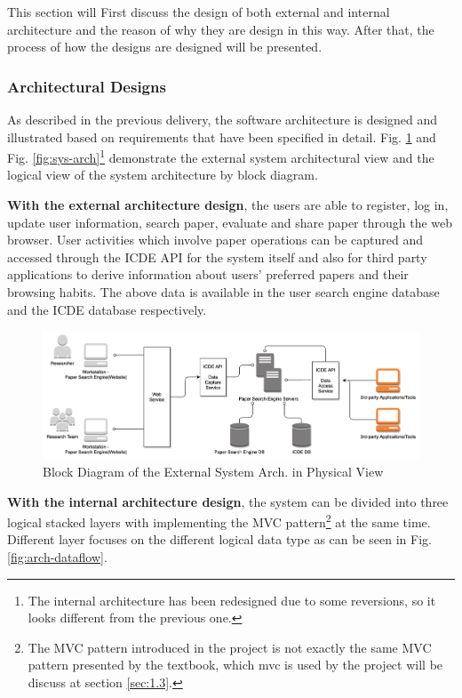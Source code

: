 \documentclass[conference]{IEEEtran}
\begin{document}
This section will First discuss the design of both external and internal architecture and the reason of why they are design in this way.
After that, the process of how the designs are designed will be presented.

\subsubsection{\textbf{Architectural Designs}}
\label{sec:1.1.1}

As described in the previous delivery, the software architecture is designed and illustrated based on requirements that have been specified in detail.
Fig. \ref{fig:sys-context} and  Fig. \ref{fig:sys-arch}\footnote{The internal architecture has been redesigned due to some reversions, so it looks different from the previous one.}
demonstrate the external system architectural view and the logical view of the system architecture by block diagram.

\textbf{With the external architecture design}, the users are able to register, log in, update user information, search paper, evaluate and share paper through the web browser.
User activities which involve paper operations can be captured and accessed through the ICDE API for the system itself
and also for third party applications to derive information about users' preferred papers and their browsing habits.
The above data is available in the user search engine database and the ICDE database respectively.

\begin{figure}[!ht]
	\centering
	\includegraphics[scale=0.06]{sys-context.png}
	\caption{Block Diagram of the External System Arch. in Physical View}
	\label{fig:sys-context}
\end{figure}

\textbf{With the internal architecture design}, the system can be divided into three logical stacked layers
with implementing the MVC pattern\footnote{The MVC pattern introduced in the project is not exactly the same MVC pattern presented by the textbook\cite{textbook}, which mvc is used by the project will be discuss at section \ref{sec:1.3}.} at the same time.
Different layer focuses on the different logical data type as can be seen in Fig. \ref{fig:arch-dataflow}.
\end{document}
